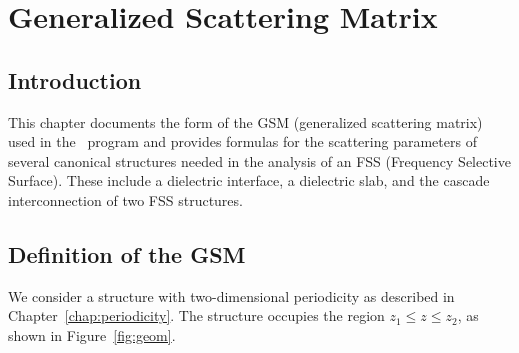 
\chapter{Generalized Scattering Matrix}
\label{chap:gsm}

\section{Introduction}
This chapter documents the form of the GSM (generalized scattering
matrix) used in the \pssfss\ program and provides
formulas for the
scattering parameters of several
canonical structures needed in the analysis of an FSS
(Frequency Selective Surface).  These
include a dielectric interface, a dielectric slab, and the
cascade interconnection of two FSS structures.


\section{Definition of the GSM}
We consider a structure with two-dimensional periodicity as described
in Chapter~\ref{chap:periodicity}.  The structure occupies the region $z_1 \leq z
\leq z_2$, as shown in Figure~\ref{fig:geom}.
%
